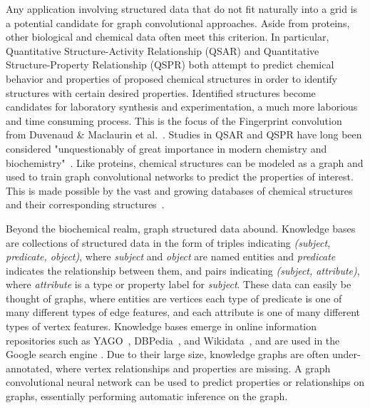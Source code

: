 Any application involving structured data that do not fit naturally into a grid is a potential candidate for graph convolutional approaches.
Aside from proteins, other biological and chemical data often meet this criterion.
In particular, Quantitative Structure-Activity Relationship (QSAR) and Quantitative Structure-Property Relationship (QSPR) both attempt to predict chemical behavior and properties of proposed chemical structures in order to identify structures with certain desired properties. 
Identified structures become candidates for laboratory synthesis and experimentation, a much more laborious and time consuming process. 
This is the focus of the Fingerprint convolution from Duvenaud \& Maclaurin et al.~\cite{duvenaud2015}.
Studies in QSAR and QSPR have long been considered "unquestionably of great importance in modern chemistry and biochemistry"~\cite{karelson1996}.
Like proteins, chemical structures can be modeled as a graph and used to train graph convolutional networks to predict the properties of interest.
This is made possible by the vast and growing databases of chemical structures and their corresponding structures~\cite{olah2008, judson2008}.

Beyond the biochemical realm, graph structured data abound.
Knowledge bases are collections of structured data in the form of triples indicating \emph{(subject, predicate, object)}, where \emph{subject} and \emph{object} are named entities and \emph{predicate} indicates the relationship between them, and pairs indicating \emph{(subject, attribute)}, where \emph{attribute} is a type or property label for \emph{subject}.
These data can easily be thought of graphs, where entities are vertices each type of predicate is one of many different types of edge features, and each attribute is one of many different types of vertex features.
Knowledge bases emerge in online information repositories such as YAGO~\cite{mahdisoltani2014}, DBPedia~\cite{auer2007}, and Wikidata~\cite{vrandevcic2014}, and are used in the Google search engine \cite{singhal2012}.
Due to their large size, knowledge graphs are often under-annotated, where vertex relationships and properties are missing. 
A graph convolutional neural network can be used to predict properties or relationships on graphs, essentially performing automatic inference on the graph.



